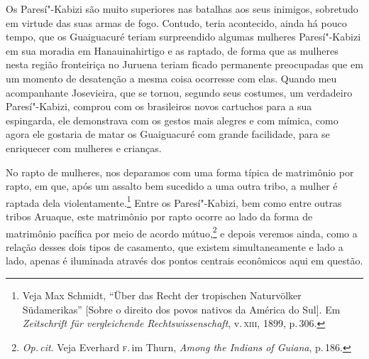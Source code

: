 Os Paresí"-Kabizi são muito superiores nas batalhas aos seus inimigos, sobretudo em virtude
das suas armas de fogo. Contudo, teria acontecido, ainda há pouco
tempo, que os Guaiguacuré teriam surpreendido algumas mulheres Paresí"-Kabizi
em sua moradia em Hanauinahirtigo e as raptado, de forma que as
mulheres nesta região fronteiriça no Juruena teriam ficado permanente
preocupadas que em um momento de desatenção a mesma coisa ocorresse com
elas. Quando meu acompanhante Josevieira, que se tornou, segundo seus
costumes, um verdadeiro Paresí"-Kabizi, comprou com os brasileiros novos
cartuchos para a sua espingarda, ele demonstrava com os gestos mais
alegres e com mímica, como agora ele gostaria de matar os Guaiguacuré
com grande facilidade, para se enriquecer com mulheres e crianças.

No rapto de mulheres, nos deparamos com uma forma típica de matrimônio
por rapto, em que, após um assalto bem sucedido a uma outra tribo, a
mulher é raptada dela violentamente.\footnote{Veja Max Schmidt, ``Über
  das Recht der tropischen Naturvölker Südamerikas'' {[}Sobre o direito
  dos povos nativos da América do Sul{]}. Em \textit{Zeitschrift für
  vergleichende Rechtswissenschaft}, v.\,\textsc{xiii}, 1899, p.\,306.} Entre os
Paresí"-Kabizi, bem como entre outras tribos Aruaque, este matrimônio por
rapto ocorre ao lado da forma de matrimônio pacífica por meio de acordo
mútuo,\footnote{\textit{Op.\,cit}. Veja Everhard \textsc{f}.\,im Thurn, \textit{Among the
  Indians of Guiana}, p.\,186.} e depois veremos ainda, como a relação
desses dois tipos de casamento, que existem simultaneamente e lado a
lado, apenas é iluminada através dos pontos centrais econômicos aqui em
questão.

